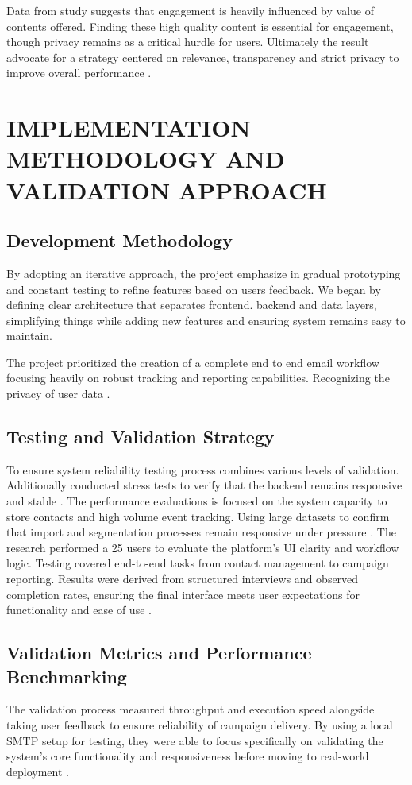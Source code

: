 \documentclass[12pt,journal,compsoc]{IEEEtran}
\begin{document}
Data from study suggests that engagement is heavily influenced by value of contents offered. Finding these high quality content is essential for engagement, though privacy remains as a critical hurdle for users. Ultimately the result advocate for a strategy centered on relevance, transparency and strict privacy to improve overall performance \cite{ref20}.

\section{IMPLEMENTATION METHODOLOGY AND VALIDATION APPROACH}

\subsection{Development Methodology}
By adopting an iterative approach, the project emphasize in gradual prototyping and constant testing to refine features based on users feedback. We began by defining clear architecture that separates frontend. backend and data layers, simplifying things while adding new features and ensuring system remains easy to maintain.

The project prioritized the creation of a complete end to end email workflow focusing heavily on robust tracking and reporting capabilities. Recognizing the privacy of user data \cite{ref15,ref16}.

\subsection{Testing and Validation Strategy}
To ensure system reliability testing process combines various levels of validation. Additionally conducted stress tests to verify that the backend remains responsive and stable \cite{ref18}. The performance evaluations is focused on the system capacity to store contacts and high volume event tracking. Using large datasets to confirm that import and segmentation processes remain responsive under pressure \cite{ref1,ref19}. The research performed a 25 users to evaluate the platform's UI clarity and workflow logic. Testing covered end-to-end tasks from contact management to campaign reporting. Results were derived from structured interviews and observed completion rates, ensuring the final interface meets user expectations for functionality and ease of use \cite{ref20}.

\subsection{Validation Metrics and Performance Benchmarking}
The validation process measured throughput and execution speed alongside taking user feedback to ensure reliability of campaign delivery. By using a local SMTP setup for testing, they were able to focus specifically on validating the system's core functionality and responsiveness before moving to real-world deployment \cite{ref19}.
\end{document}
